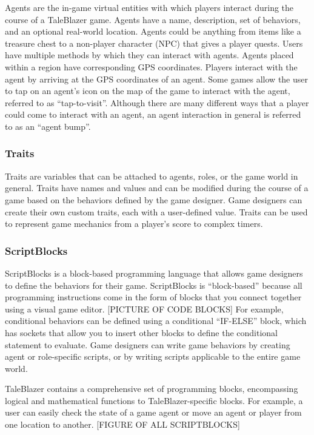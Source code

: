Agents are the in-game virtual entities with which players interact during the course of a TaleBlazer game. Agents have a name, description, set of behaviors, and an optional real-world location. Agents could be anything from items like a treasure chest to a non-player character (NPC) that gives a player quests. Users have multiple methods by which they can interact with agents. Agents placed within a region have corresponding GPS coordinates. Players interact with the agent by arriving at the GPS coordinates of an agent. Some games allow the user to tap on an agent's icon on the map of the game to interact with the agent, referred to as ``tap-to-visit''. Although there are many different ways that a player could come to interact with an agent, an agent interaction in general is referred to as an ``agent bump''.

\subsubsection{Traits}

Traits are variables that can be attached to agents, roles, or the game world in general. Traits have names and values and can be modified during the course of a game based on the behaviors defined by the game designer. Game designers can create their own custom traits, each with a user-defined value. Traits can be used to represent game mechanics from a player's score to complex timers. 

\subsubsection{ScriptBlocks}

ScriptBlocks is a block-based programming language that allows game designers to define the behaviors for their game. ScriptBlocks is ``block-based'' because all programming instructions come in the form of blocks that you connect together using a visual game editor. [PICTURE OF CODE BLOCKS] For example, conditional behaviors can be defined using a conditional ``IF-ELSE'' block, which has sockets that allow you to insert other blocks to define the conditional statement to evaluate. Game designers can write game behaviors by creating agent or role-specific scripts, or by writing scripts applicable to the entire game world. 

TaleBlazer contains a comprehensive set of programming blocks, encompassing logical and mathematical functions to TaleBlazer-specific blocks. For example, a user can easily check the state of a game agent or move an agent or player from one location to another. [FIGURE OF ALL SCRIPTBLOCKS]

